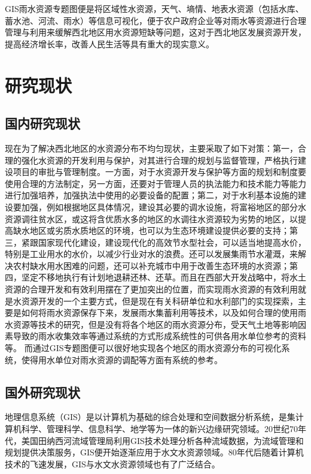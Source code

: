 GIS雨水资源专题图便是将区域性水资源，天气、墒情、地表水资源（包括水库、蓄水池、河流、雨水）等信息可视化，便于农户政府企业等对雨水等资源进行合理管理与利用来缓解西北地区用水资源短缺等问题，这对于西北地区发展资源开发\cite{刘治华-5}，提高经济增长率，改善人民生活等具有重大的现实意义。


\section{研究现状}
\subsection{国内研究现状}

现在为了解决西北地区的水资源分布不均匀现状，主要采取了如下对策：第一，合理的强化水资源的开发利用与保护，对其进行合理的规划与监督管理，严格执行建设项目的审批与管理制度。一方面，对于水资源开发与保护等方面的规划和制度要使用合理的方法制定，另一方面，还要对于管理人员的执法能力和技术能力等能力进行加强培养，加强执法中使用的必要设备的配置；第二，对于水利基本设施的建设要加强，例如根据地区具体情况，建设其必要的调水设施，将富裕地区的部分水资源调往贫水区，或这将含优质水多的地区的水调往水资源较为劣势的地区，以提高缺水地区或劣质水质地区的环境，也可以为生态环境建设提供必要的支持；第三，紧跟国家现代化建设，建设现代化的高效节水型社会，可以适当地提高水价，特别是工业用水的水价，以减少行业对水的浪费。还可以发展集雨节水灌溉，来解决农村缺水用水困难的问题，还可以补充城市中用于改善生态环境的水资源；第四，坚定不移地执行有计划地退耕还林、还草。而且在西部大开发战略中，将水土资源的合理开发和有效利用摆在了更加突出的位置，而实现雨水资源的有效利用就是水资源开发的一个主要方式，但是现在有关科研单位和水利部门的实现探索，主要是如何将雨水资源保存下来，发展雨水集蓄利用等技术，以及如何合理的使用雨水资源等技术的研究，但是没有将各个地区的雨水资源分布，受天气土地等影响因素导致的雨水收集效率等通过系统的方式形成系统性的可供各用水单位参考的资料等。
而通过GIS专题图便可以很好地实现各个地区的雨水资源分布的可视化系统，使得用水单位对雨水资源的调配等方面有系统的参考。

\subsection{国外研究现状}
地理信息系统（GIS）是以计算机为基础的综合处理和空间数据分析系统，是集计算机科学、管理科学、信息科学、地学等为一体的新兴边缘研究领域\cite{陈鲁周-25}。20世纪70年代，美国田纳西河流域管理局利用GIS技术处理分析各种流域数据，为流域管理和规划提供决策服务，GIS便开始逐渐应用于水文水资源领域。80年代后随着计算机技术的飞速发展，GIS与水文水资源领域也有了广泛结合\cite{刘佳于福亮-24}。

